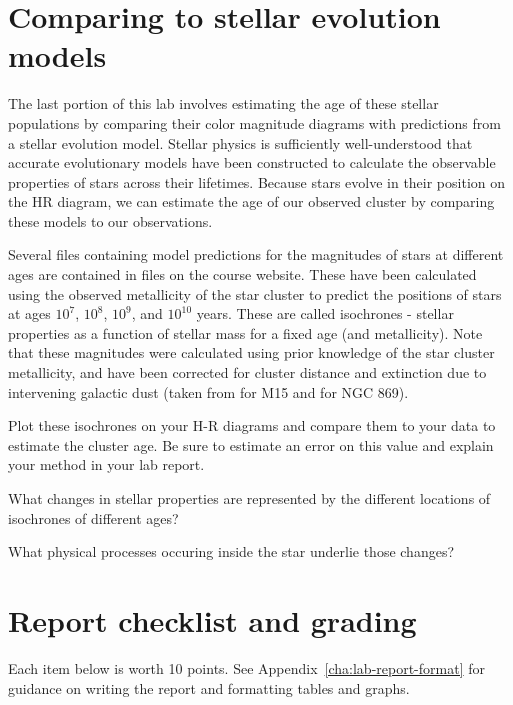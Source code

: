 \section{Comparing to stellar evolution models}

The last portion of this lab involves estimating the age of these stellar populations by comparing their color magnitude diagrams with predictions from a stellar evolution model. Stellar physics is sufficiently well-understood that accurate evolutionary models have been constructed to calculate the observable properties of stars across their lifetimes. Because stars evolve in their position on the HR diagram, we can estimate the age of our observed cluster by comparing these models to our observations.

Several files containing model predictions for the magnitudes of stars at different ages are contained in files on the course website. These have been calculated using the observed metallicity of the star cluster to predict the positions of stars at ages $10^7$, $10^8$, $10^9$, and $10^{10}$ years. These are called isochrones - stellar properties as a function of stellar mass for a fixed age (and metallicity). Note that these magnitudes were calculated using prior knowledge of the star cluster metallicity, and have been corrected for cluster distance and extinction due to intervening galactic dust (taken from \cite{DurrellHarris1993} for M15 and \cite{Currie2010} for NGC 869).

\begin{steps}
	\item Plot these isochrones on your H-R diagrams and compare them to your data to estimate the cluster age. Be sure to estimate an error on this value and explain your method in your lab report.
	
	\item What changes in stellar properties are represented by the different locations of isochrones of different ages?
	
	\item What physical processes occuring inside the star underlie those changes?
\end{steps}

\section{Report checklist and grading}

Each item below is worth 10 points. See Appendix\ \ref{cha:lab-report-format} for guidance on writing the report and formatting tables and graphs.

